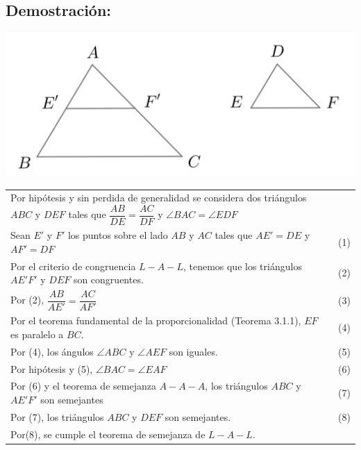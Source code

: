 \documentclass[12pt,a4paper]{article}
\begin{document}
\subsection*{Demostración:} 
\begin{center}
\includegraphics[scale=0.8]{semejanza.png} 
\end{center}
\begin{tabular}{p{15.9cm} p{1cm}}
Por hipótesis y sin perdida de generalidad se considera dos triángulos $ABC$ y $DEF$ tales que $\dfrac{AB}{DE}=\dfrac{AC}{DF}$ y $\angle BAC=\angle EDF$
\\Sean $E'$ y $F'$ los puntos sobre el lado $AB$ y $AC$ tales que $AE'=DE$ y $AF'=DF$& (1)
\\Por el criterio de congruencia $L-A-L$, tenemos que los triángulos $AE'F'$ y $DEF$ son congruentes. &\medskip(2)
\\Por (2), $\dfrac{AB}{AE'}=\dfrac{AC}{AF'}$ &(3)
\\Por el teorema fundamental de la proporcionalidad (Teorema 3.1.1), $EF$ es paralelo a $BC$. &(4) 
\\Por (4), los ángulos $\angle ABC$ y $\angle AEF$ son iguales. &(5)
\\Por hipótesis y (5), $\angle BAC= \angle EAF$&(6)
\\Por (6) y el teorema de semejanza $A-A-A$, los triángulos $ABC$ y $AE'F'$ son semejantes&(7)
\\Por (7), los triángulos $ABC$ y $DEF$ son semejantes. &(8)
\\Por(8), se cumple el teorema de semejanza de $L-A-L$.
\end{tabular}
\end{document}
